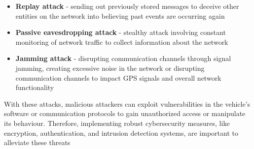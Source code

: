 \documentclass[10pt,oneside,english,a4paper]{article}
\begin{document}
\begin{enumerate}
\begin{itemize}
        \item \textbf{Replay attack} - sending out previously stored messages to deceive other entities on the network into believing past events are occurring again
        \item \textbf{Passive eavesdropping attack} - stealthy attack involving constant monitoring of network traffic to collect information about the network
        \item \textbf{Jamming attack} - disrupting communication channels through signal jamming, creating excessive noise in the network or disrupting communication channels to impact GPS signals and overall network functionality        
    \end{itemize}
\end{enumerate}
\par With these attacks, malicious attackers can exploit vulnerabilities in the vehicle's software or communication protocols to gain unauthorized access or manipulate its behaviour. Therefore, implementing robust cybersecurity measures, like encryption, authentication, and intrusion detection systems, are important to alleviate these threats \cite{researchresults, stateoftheart, Communicationsecurity, edgecomputing}

\end{document}
